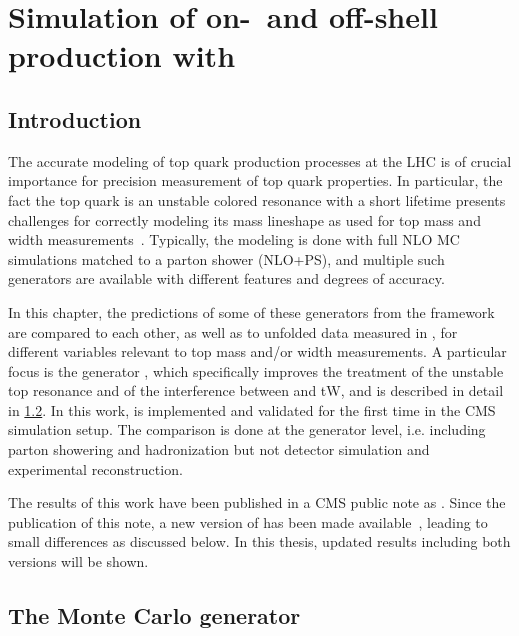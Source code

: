 \chapter{Simulation of on-~and off-shell \ttbartitle production with \texorpdfstring{\bbfourl}{bb4l}}
\label{ch:bb4l}

\section{Introduction}

The accurate modeling of top quark production processes at the LHC is of crucial importance for precision measurement of top quark properties. In particular, the fact the top quark is an unstable colored resonance with a short lifetime presents challenges for correctly modeling its mass lineshape as used for top mass and width measurements~\cite{Tarrach:1980up,Smith:1996xz,Hoang:2020iah}. Typically, the modeling is done with full NLO MC simulations matched to a parton shower (NLO+PS), and multiple such generators are available with different features and degrees of accuracy.

In this chapter, the predictions of some of these generators from the \powheg framework~\cite{Powheg:2004,Powheg:2007} are compared to each other, as well as to unfolded data measured in , for different variables relevant to top mass and/or width measurements. A particular focus is the generator \bbfourl \cite{Jezo:2016ujg}, which specifically improves the treatment of the unstable top resonance and of the interference between \ttbar and tW, and is described in detail in \cref{sec:bb4l:bb4l}. In this work, \bbfourl is implemented and validated for the first time in the CMS simulation setup. The comparison is done at the generator level, i.e. including parton showering and hadronization but not detector simulation and experimental reconstruction.

The results of this work have been published in a CMS public note as . Since the publication of this note, a new version of \bbfourl has been made available~\cite{Jezo:2023rht}, leading to small differences as discussed below. In this thesis, updated results including both versions will be shown.

\section{The Monte Carlo generator \texorpdfstring{\bbfourl}{bb4l}}
\label{sec:bb4l:bb4l}

